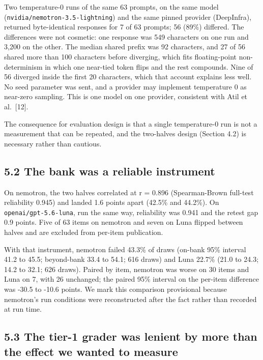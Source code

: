 \documentclass[
  11pt,
]{article}
\begin{document}
Two temperature-0 runs of the same 63 prompts, on the same model
(\texttt{nvidia/nemotron-3.5-lightning}) and the same pinned provider
(DeepInfra), returned byte-identical responses for 7 of 63 prompts; 56
(89\%) differed. The differences were not cosmetic: one response was 549
characters on one run and 3,200 on the other. The median shared prefix
was 92 characters, and 27 of 56 shared more than 100 characters before
diverging, which fits floating-point non-determinism in which one
near-tied token flips and the rest compounds. Nine of 56 diverged inside
the first 20 characters, which that account explains less well. No seed
parameter was sent, and a provider may implement temperature 0 as
near-zero sampling. This is one model on one provider, consistent with
Atil et al.~{[}12{]}.

The consequence for evaluation design is that a single temperature-0 run
is not a measurement that can be repeated, and the two-halves design
(Section 4.2) is necessary rather than cautious.

\hypertarget{the-bank-was-a-reliable-instrument}{%
\subsection{5.2 The bank was a reliable
instrument}\label{the-bank-was-a-reliable-instrument}}

On nemotron, the two halves correlated at r = 0.896 (Spearman-Brown
full-test reliability 0.945) and landed 1.6 points apart (42.5\% and
44.2\%). On \texttt{openai/gpt-5.6-luna}, run the same way, reliability
was 0.941 and the retest gap 0.9 points. Five of 63 items on nemotron
and seven on Luna flipped between halves and are excluded from per-item
publication.

With that instrument, nemotron failed 43.3\% of draws (on-bank 95\%
interval 41.2 to 45.5; beyond-bank 33.4 to 54.1; 616 draws) and Luna
22.7\% (21.0 to 24.3; 14.2 to 32.1; 626 draws). Paired by item, nemotron
was worse on 30 items and Luna on 7, with 26 unchanged; the paired 95\%
interval on the per-item difference was -30.5 to -10.6 points. We mark
this comparison provisional because nemotron's run conditions were
reconstructed after the fact rather than recorded at run time.

\hypertarget{the-tier-1-grader-was-lenient-by-more-than-the-effect-we-wanted-to-measure}{%
\subsection{5.3 The tier-1 grader was lenient by more than the effect we
wanted to
measure}\label{the-tier-1-grader-was-lenient-by-more-than-the-effect-we-wanted-to-measure}}
\end{document}
